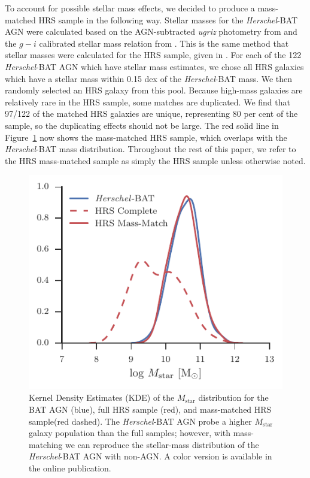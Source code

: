 \documentclass[fleqn, usenatbib]{mnras}
\newcommand{\herschel}{\emph{Herschel}}
\newcommand{\mstar}{$M_{\mathrm{star}}$}
\begin{document}
To account for possible stellar mass effects, we decided to produce a mass-matched HRS sample in the following way. Stellar masses for the \herschel-BAT AGN were calculated based on the AGN-subtracted \textit{ugriz} photometry from \citet{Koss:2011vn} and the $g-i$ calibrated stellar mass relation from \citet{Zibetti:2009jf}. This is the same method that stellar masses were calculated for the HRS sample, given in \citet{Cortese:2012fj}. For each of the 122 \herschel-BAT AGN which have stellar mass estimates, we chose all HRS galaxies which have a stellar mass within 0.15 dex of the \herschel-BAT mass. We then randomly selected an HRS galaxy from this pool. Because high-mass galaxies are relatively rare in the HRS sample, some matches are duplicated. We find that 97/122 of the matched HRS galaxies are unique, representing 80 per cent of the sample, so the duplicating effects should not be large. The red solid line in Figure~\ref{fig:mstar_dist} now shows the mass-matched HRS sample, which overlaps with the \herschel-BAT mass distribution. Throughout the rest of this paper, we refer to the HRS mass-matched sample as simply the HRS sample unless otherwise noted.
 
\begin{figure}
\includegraphics[width=\columnwidth]{figures/stellar_mass_comp_hrs_match}
\caption{Kernel Density Estimates (KDE) of the \mstar{} distribution for the BAT AGN (blue), full HRS sample (red), and mass-matched HRS sample(red dashed). The \herschel-BAT AGN probe a higher \mstar{} galaxy population than the full samples; however, with mass-matching we can reproduce the stellar-mass distribution of the \herschel-BAT AGN with non-AGN. A color version is available in the online publication. \label{fig:mstar_dist}}
\end{figure}
\end{document}
